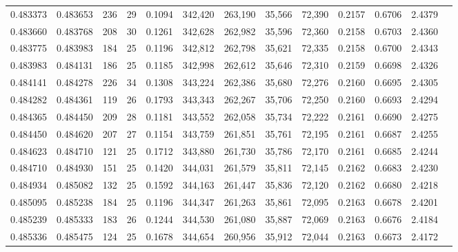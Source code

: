 \begin{tabular}{rrrrrrrrrrrrr}
0.483373 & 0.483653 &   236 &  29 &                                     0.1094 & 342,420 & 263,190 &  35,566 &  72,390 & 0.2157 & 0.6706 & 2.4379 \\
0.483660 & 0.483768 &   208 &  30 &                                     0.1261 & 342,628 & 262,982 &  35,596 &  72,360 & 0.2158 & 0.6703 & 2.4360 \\
0.483775 & 0.483983 &   184 &  25 &                                     0.1196 & 342,812 & 262,798 &  35,621 &  72,335 & 0.2158 & 0.6700 & 2.4343 \\
0.483983 & 0.484131 &   186 &  25 &                                     0.1185 & 342,998 & 262,612 &  35,646 &  72,310 & 0.2159 & 0.6698 & 2.4326 \\
0.484141 & 0.484278 &   226 &  34 &                                     0.1308 & 343,224 & 262,386 &  35,680 &  72,276 & 0.2160 & 0.6695 & 2.4305 \\
0.484282 & 0.484361 &   119 &  26 &                                     0.1793 & 343,343 & 262,267 &  35,706 &  72,250 & 0.2160 & 0.6693 & 2.4294 \\
0.484365 & 0.484450 &   209 &  28 &                                     0.1181 & 343,552 & 262,058 &  35,734 &  72,222 & 0.2161 & 0.6690 & 2.4275 \\
0.484450 & 0.484620 &   207 &  27 &                                     0.1154 & 343,759 & 261,851 &  35,761 &  72,195 & 0.2161 & 0.6687 & 2.4255 \\
0.484623 & 0.484710 &   121 &  25 &                                     0.1712 & 343,880 & 261,730 &  35,786 &  72,170 & 0.2161 & 0.6685 & 2.4244 \\
0.484710 & 0.484930 &   151 &  25 &                                     0.1420 & 344,031 & 261,579 &  35,811 &  72,145 & 0.2162 & 0.6683 & 2.4230 \\
0.484934 & 0.485082 &   132 &  25 &                                     0.1592 & 344,163 & 261,447 &  35,836 &  72,120 & 0.2162 & 0.6680 & 2.4218 \\
0.485095 & 0.485238 &   184 &  25 &                                     0.1196 & 344,347 & 261,263 &  35,861 &  72,095 & 0.2163 & 0.6678 & 2.4201 \\
0.485239 & 0.485333 &   183 &  26 &                                     0.1244 & 344,530 & 261,080 &  35,887 &  72,069 & 0.2163 & 0.6676 & 2.4184 \\
0.485336 & 0.485475 &   124 &  25 &                                     0.1678 & 344,654 & 260,956 &  35,912 &  72,044 & 0.2163 & 0.6673 & 2.4172 \\

\end{tabular}
